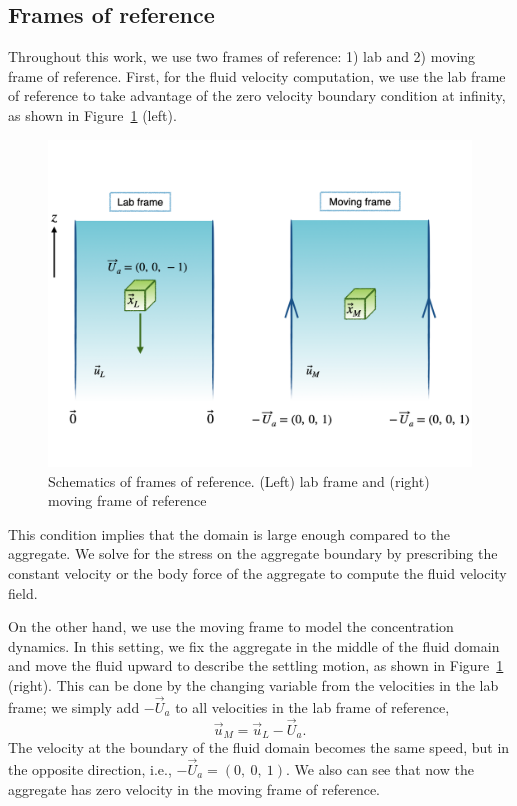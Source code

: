 \subsection{Frames of reference}
Throughout this work, we use two frames of reference: 1) lab and 2) moving frame of reference. First, for the fluid velocity computation, we use the lab frame of reference to take advantage of the zero velocity boundary condition at infinity, as shown in Figure~\ref{fig_frame_ref} (left). 
\begin{figure}[h]
	\begin{center}
		\includegraphics[scale=0.4]{figures/fig_frame_ref}
	\end{center}
	\caption{Schematics of frames of reference. (Left) lab frame and (right) moving frame of reference }
	\label{fig_frame_ref}
\end{figure}
This condition implies that the domain is large enough compared to the aggregate.
We solve for the stress on the aggregate boundary by prescribing the constant velocity or the body force of the aggregate to compute the fluid velocity field. 
\par
On the other hand, we use the moving frame to model the concentration dynamics.
In this setting, we fix the aggregate in the middle of the fluid domain and move the fluid upward to describe the settling motion, as shown in Figure~\ref{fig_frame_ref} (right).
This can be done by the changing variable from the velocities in the lab frame; we simply add $-\vec{U}_a$ to all velocities in the lab frame of reference,
\[
\vec{u}_M = \vec{u}_L - \vec{U}_a.
\]
 The velocity at the boundary of the fluid domain becomes the same speed, but in the opposite direction, i.e., $-\vec{U}_a = (0, \ 0, \ 1)$. We also can see that now the aggregate has zero velocity in the moving frame of reference.

